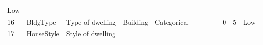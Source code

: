 \documentclass[11pt]{article}
\begin{document}
\begin{longtable}[]{@{}llllllllllll@{}}
\begin{minipage}[t]{0.04\columnwidth}
Low\strut
\end{minipage}\tabularnewline
\begin{minipage}[t]{0.04\columnwidth}\raggedright\strut
16\strut
\end{minipage} & \begin{minipage}[t]{0.04\columnwidth}\raggedright\strut
BldgType\strut
\end{minipage} & \begin{minipage}[t]{0.04\columnwidth}\raggedright\strut
Type of dwelling\strut
\end{minipage} & \begin{minipage}[t]{0.04\columnwidth}\raggedright\strut
Building\strut
\end{minipage} & \begin{minipage}[t]{0.04\columnwidth}\raggedright\strut
Categorical\strut
\end{minipage} & \begin{minipage}[t]{0.04\columnwidth}\raggedright\strut
\strut
\end{minipage} & \begin{minipage}[t]{0.04\columnwidth}\raggedright\strut
\strut
\end{minipage} & \begin{minipage}[t]{0.04\columnwidth}\raggedright\strut
\strut
\end{minipage} & \begin{minipage}[t]{0.04\columnwidth}\raggedright\strut
\strut
\end{minipage} & \begin{minipage}[t]{0.04\columnwidth}\raggedright\strut
0\strut
\end{minipage} & \begin{minipage}[t]{0.04\columnwidth}\raggedright\strut
5\strut
\end{minipage} & \begin{minipage}[t]{0.04\columnwidth}\raggedright\strut
Low\strut
\end{minipage}\tabularnewline
\begin{minipage}[t]{0.04\columnwidth}\raggedright\strut
17\strut
\end{minipage} & \begin{minipage}[t]{0.04\columnwidth}\raggedright\strut
HouseStyle\strut
\end{minipage} & \begin{minipage}[t]{0.04\columnwidth}\raggedright\strut
Style of dwelling\strut
\end{minipage} & \begin{minipage}[t]{0.04\columnwidth}\raggedright\strut

\end{minipage}
\end{longtable}
\end{document}
